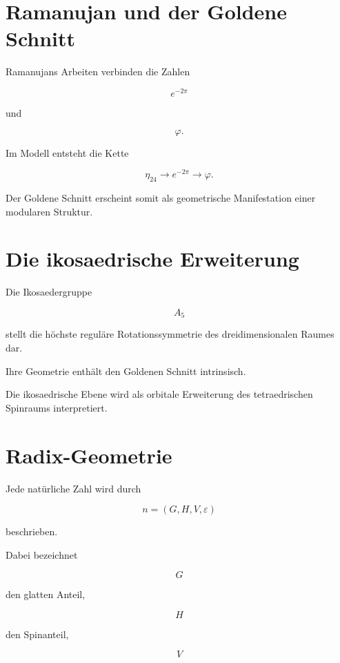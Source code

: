 \documentclass[11pt,a4paper]{article}
\theoremstyle{definition}
\theoremstyle{remark}
\begin{document}
	
	\section{Ramanujan und der Goldene Schnitt}
	
	Ramanujans Arbeiten verbinden die Zahlen
	
	\[
	e^{-2\pi}
	\]
	
	und
	
	\[
	\varphi.
	\]
	
	Im Modell entsteht die Kette
	
	\[
	\eta_{24}
	\longrightarrow
	e^{-2\pi}
	\longrightarrow
	\varphi.
	\]
	
	Der Goldene Schnitt erscheint somit
	als geometrische Manifestation
	einer modularen Struktur.
	
	
	\section{Die ikosaedrische Erweiterung}
	
	Die Ikosaedergruppe
	
	\[
	A_5
	\]
	
	stellt die höchste reguläre Rotationssymmetrie
	des dreidimensionalen Raumes dar.
	
	Ihre Geometrie enthält den Goldenen Schnitt intrinsisch.
	
	Die ikosaedrische Ebene wird als orbitale Erweiterung
	des tetraedrischen Spinraums interpretiert.
	
	
	\section{Radix-Geometrie}
	
	Jede natürliche Zahl wird durch
	
	\[
	n=(G,H,V,\varepsilon)
	\]
	
	beschrieben.
	
	Dabei bezeichnet
	
	\[
	G
	\]
	
	den glatten Anteil,
	
	\[
	H
	\]
	
	den Spinanteil,
	
	\[
	V
	\]
	
\end{document}
